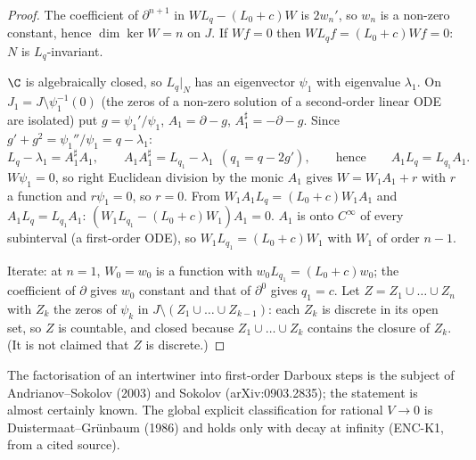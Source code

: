 \begin{proof}
The coefficient of $\partial^{n+1}$ in $WL_q-(L_0+c)W$ is $2w_n'$, so $w_n$ is a non-zero constant, hence $\dim\ker W=n$ on $J$. If $Wf=0$ then $WL_qf=(L_0+c)Wf=0$: $N$ is $L_q$-invariant.

$\C$ is algebraically closed, so $L_q|_N$ has an eigenvector $\psi_1$ with eigenvalue $\lambda_1$. On $J_1=J\setminus\psi_1^{-1}(0)$ (the zeros of a non-zero solution of a second-order linear ODE are isolated) put $g=\psi_1'/\psi_1$, $A_1=\partial-g$, $A_1^\sharp=-\partial-g$. Since $g'+g^2=\psi_1''/\psi_1=q-\lambda_1$:
\[
L_q-\lambda_1=A_1^\sharp A_1,\qquad A_1A_1^\sharp=L_{q_1}-\lambda_1\ \ (q_1=q-2g'),\qquad\text{hence}\qquad A_1L_q=L_{q_1}A_1 .
\]
$W\psi_1=0$, so right Euclidean division by the monic $A_1$ gives $W=W_1A_1+r$ with $r$ a function and $r\psi_1=0$, so $r=0$. From $W_1A_1L_q=(L_0+c)W_1A_1$ and $A_1L_q=L_{q_1}A_1$: $(W_1L_{q_1}-(L_0+c)W_1)A_1=0$. $A_1$ is onto $C^\infty$ of every subinterval (a first-order ODE), so $W_1L_{q_1}=(L_0+c)W_1$ with $W_1$ of order $n-1$.

Iterate: at $n=1$, $W_0=w_0$ is a function with $w_0L_{q_1}=(L_0+c)w_0$; the coefficient of $\partial$ gives $w_0$ constant and that of $\partial^0$ gives $q_1=c$. Let $Z=Z_1\cup\dots\cup Z_n$ with $Z_k$ the zeros of $\psi_k$ in $J\setminus(Z_1\cup\dots\cup Z_{k-1})$: each $Z_k$ is discrete in its open set, so $Z$ is countable, and closed because $Z_1\cup\dots\cup Z_k$ contains the closure of $Z_k$. (It is not claimed that $Z$ is discrete.)

\end{proof}

\begin{caution}[title=Priority]
The factorisation of an intertwiner into first-order Darboux steps is the subject of Andrianov--Sokolov (2003) and Sokolov (arXiv:0903.2835); the statement is almost certainly known. The global explicit classification for rational $V\to0$ is Duistermaat--Gr\"unbaum (1986) and holds only with decay at infinity (ENC-K1, from a cited source).
\end{caution}

